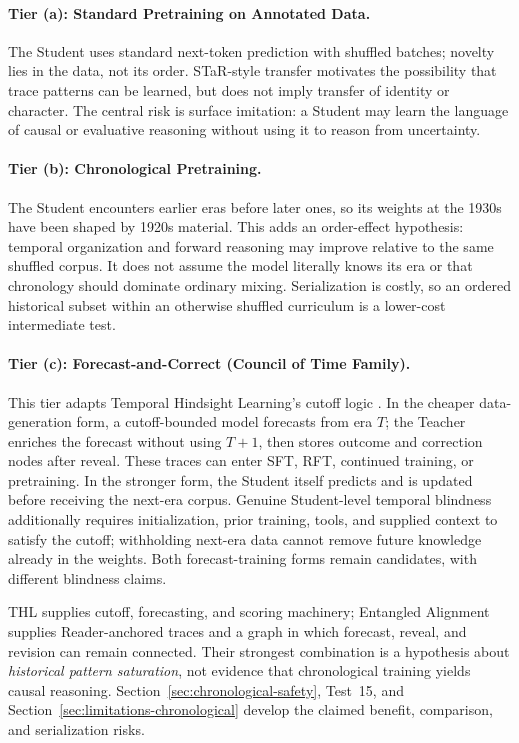 \paragraph{Tier (a): Standard Pretraining on Annotated Data.} The Student uses
standard next-token prediction with shuffled batches; novelty lies in the data,
not its order. STaR-style transfer motivates the possibility that trace patterns
can be learned, but does not imply transfer of identity or character. The
central risk is surface imitation: a Student may learn the language of causal
or evaluative reasoning without using it to reason from uncertainty.

\paragraph{Tier (b): Chronological Pretraining.} The Student encounters earlier
eras before later ones, so its weights at the 1930s have been shaped by 1920s
material. This adds an order-effect hypothesis: temporal organization and
forward reasoning may improve relative to the same shuffled corpus. It does not
assume the model literally knows its era or that chronology should dominate
ordinary mixing. Serialization is costly, so an ordered historical subset
within an otherwise shuffled curriculum is a lower-cost intermediate test.

\paragraph{Tier (c): Forecast-and-Correct (Council of Time Family).} This tier
adapts Temporal Hindsight Learning's cutoff logic \cite{westerberg2026thl}. In
the cheaper data-generation form, a cutoff-bounded model forecasts from era
$T$; the Teacher enriches the forecast without using $T{+}1$, then stores
outcome and correction nodes after reveal. These traces can enter SFT, RFT,
continued training, or pretraining. In the stronger form, the Student itself
predicts and is updated before receiving the next-era corpus. Genuine Student-level temporal blindness additionally requires initialization,
prior training, tools, and supplied context to satisfy the cutoff; withholding
next-era data cannot remove future knowledge already in the weights. Both
forecast-training forms remain candidates, with different blindness claims.

THL supplies cutoff, forecasting, and scoring machinery; Entangled Alignment
supplies Reader-anchored traces and a graph in which forecast, reveal, and
revision can remain connected. Their strongest combination is a hypothesis
about \emph{historical pattern saturation}, not evidence that chronological
training yields causal reasoning. Section~\ref{sec:chronological-safety},
Test~15, and Section~\ref{sec:limitations-chronological} develop the claimed
benefit, comparison, and serialization risks.

